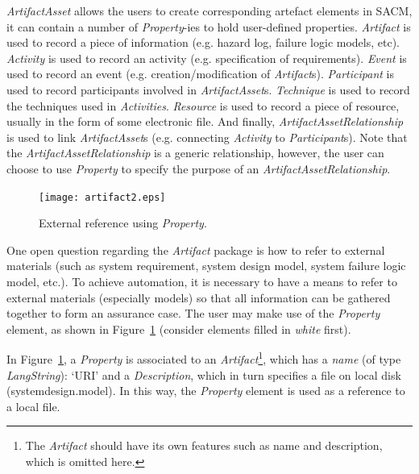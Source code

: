 \textit{ArtifactAsset} allows the users to create corresponding artefact elements in SACM, it can contain a number of \textit{Property}-ies to hold user-defined properties. \textit{Artifact} is used to record a piece of information (e.g. hazard log, failure logic models, etc). 
\textit{Activity} is used to record an activity (e.g. specification of requirements). 
\textit{Event} is used to record an event (e.g. creation/modification of \textit{Artifact}s). 
\textit{Participant} is used to record participants involved in \textit{ArtifactAsset}s. 
\textit{Technique} is used to record the techniques used in \textit{Activities}. 
\textit{Resource} is used to record a piece of resource, usually in the form of some electronic file. 
And finally, \textit{ArtifactAssetRelationship} is used to link \textit{ArtifactAsset}s (e.g. connecting \textit{Activity} to \textit{Participant}s). 
Note that the \textit{ArtifactAssetRelationship} is a generic relationship, however, the user can choose to use \textit{Property} to specify the purpose of an \textit{ArtifactAssetRelationship}. 

\begin{figure}
	\centering
	\texttt{[image: artifact2.eps]}
	\caption{External reference using \textit{Property}.}
	\label{fig:artifact1}
\end{figure}

One open question regarding the \textit{Artifact} package is how to refer to external materials (such as system requirement, system design model, system failure logic model, etc.). 
To achieve automation, it is necessary to have a means to refer to external materials (especially models) so that all information can be gathered together to form an assurance case. 
The user may make use of the \textit{Property} element, as shown in Figure~\ref{fig:artifact1} (consider elements filled in \textit{white} first).

In Figure~\ref{fig:artifact1}, a \textit{Property} is associated to an \textit{Artifact}\footnote{The \textit{Artifact} should have its own features such as name and description, which is omitted here.}, which has a \textit{name} (of type \textit{LangString}): `URI' and a \textit{Description}, which in turn specifies a file on local disk (systemdesign.model). 
In this way, the \textit{Property} element is used as a reference to a local file. 


